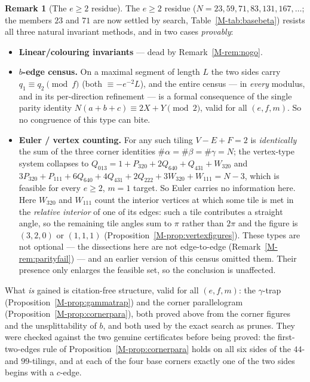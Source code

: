 \documentclass[11pt,reqno]{amsart}
\theoremstyle{plain}
\theoremstyle{definition}
\newtheorem{remark}[theorem]{Remark}
\begin{document}
\begin{remark}[The $e\ge2$ residue]\label{rem:e2}
The $e\ge2$ residue ($N=23,59,71,83,131,167,\dots$; the members $23$ and $71$ are now settled by search, Table~\ref{M-tab:basebeta}) resists all three natural invariant methods, and in two
cases \emph{provably}:
\begin{itemize}
\item \textbf{Linear/colouring invariants} --- dead by Remark~\ref{M-rem:nogo}.
\item \textbf{$b$-edge census.} On a maximal segment of length $L$ the two sides carry $q_1\equiv q_2
\pmod f$ (both $\equiv -e^{-2}L$), and the entire census --- in \emph{every} modulus, and in its
per-direction refinement --- is a formal consequence of the single parity identity
$N(a+b+c)\equiv2X+Y \pmod 2$, valid for all $(e,f,m)$. So no congruence of this type can bite.
\item \textbf{Euler / vertex counting.} For any such tiling $V-E+F=2$ is \emph{identically} the sum
of the three corner identities $\#\alpha=\#\beta=\#\gamma=N$; the vertex-type system collapses to
$Q_{013}=1+P_{320}+2Q_{640}+Q_{431}+W_{320}$ and
$3P_{320}+P_{111}+6Q_{640}+4Q_{431}+2Q_{222}+3W_{320}+W_{111}=N-3$, which is
feasible for every $e\ge2$, $m=1$ target. So Euler carries no information here.
Here $W_{320}$ and $W_{111}$ count the interior vertices at which some tile is met in the
\emph{relative interior} of one of its edges: such a tile contributes a straight angle, so the
remaining tile angles sum to $\pi$ rather than $2\pi$ and the figure is $(3,2,0)$ or $(1,1,1)$
(Proposition~\ref{M-prop:vertexfigures}). These types are not optional --- the dissections here are
not edge-to-edge (Remark~\ref{M-rem:parityfail}) --- and an earlier version of this census omitted
them. Their presence only enlarges the feasible set, so the conclusion is unaffected.
\end{itemize}
What \emph{is} gained is citation-free structure, valid for all $(e,f,m)$: the $\gamma$-trap
(Proposition~\ref{M-prop:gammatrap}) and the corner parallelogram
(Proposition~\ref{M-prop:cornerpara}), both proved above from the corner figures and the
unsplittability of $b$, and both used by the exact search as prunes. They were checked against the
two genuine certificates before being proved: the first-two-edges rule of
Proposition~\ref{M-prop:cornerpara} holds on all six sides of the $44$- and $99$-tilings, and at each
of the four base corners exactly one of the two sides begins with a $c$-edge.


\end{remark}
\end{document}
